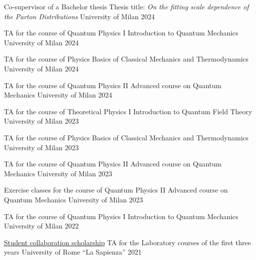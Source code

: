 
\begin{cvhonors}

    \cvhonor
    {Co-supervisor of a Bachelor thesis} %
    {Thesis title: \textit{On the fitting scale dependence of the Parton Distributions}}
    {University of Milan} %
    {2024}

    \cvhonor
    {TA for the course of Quantum Physics I} %
    {Introduction to Quantum Mechanics}
    {University of Milan} %
    {2024}

    \cvhonor
    {TA for the course of Physics} %
    {Basics of Classical Mechanics and Thermodynamics}
    {University of Milan} %
    {2024}

    \cvhonor
    {TA for the course of Quantum Physics II} %
    {Advanced course on Quantum Mechanics}
    {University of Milan} %
    {2024}

    \cvhonor
    {TA for the course of Theoretical Physics I} %
    {Introduction to Quantum Field Theory}
    {University of Milan} %
    {2023}

    \cvhonor
    {TA for the course of Physics} %
    {Basics of Classical Mechanics and Thermodynamics}
    {University of Milan} %
    {2023}

    \cvhonor
    {TA for the course of Quantum Physics II} %
    {Advanced course on Quantum Mechanics}
    {University of Milan} %
    {2023}

    \cvhonor
    {Exercise classes for the course of Quantum Physics II} %
    {Advanced course on Quantum Mechanics}
    {University of Milan} %
    {2023}

    \cvhonor
    {TA for the course of Quantum Physics I} %
    {Introduction to Quantum Mechanics}
    {University of Milan} %
    {2022}

    \cvhonor
    {\href{https://www.uniroma1.it/en/pagina/student-collaboration-scholarships}{Student collaboration scholarship}} %
    {TA for the Laboratory courses of the first three years}
    {University of Rome ``La Sapienza''} %
    {2021}

\end{cvhonors}